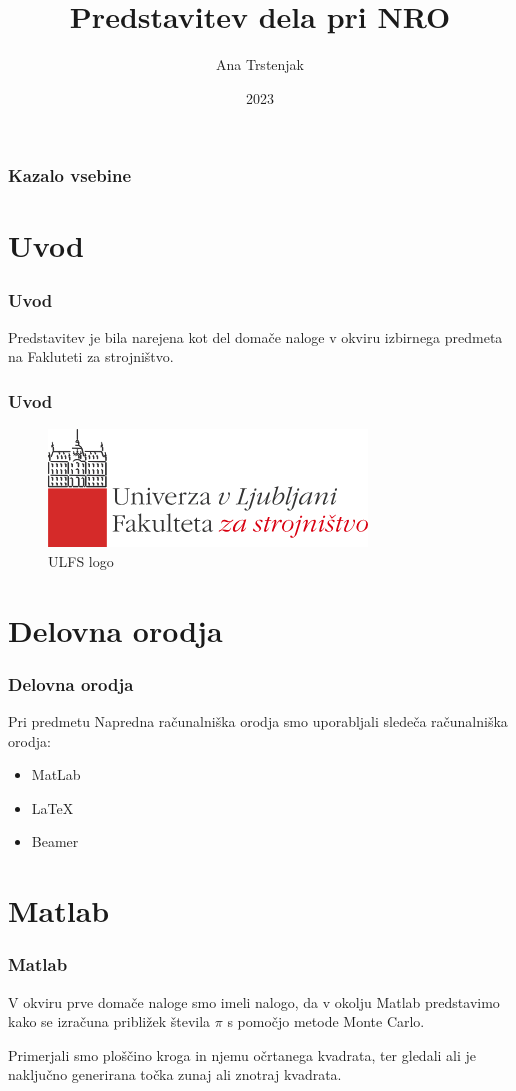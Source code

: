\documentclass{beamer}
\title{Predstavitev dela pri NRO}
\author{Ana Trstenjak}
\institute{Fakulteta za strojništvo, UL}
\date{2023}
\begin{document}
\frame{\titlepage}
\begin{frame}
\frametitle{Kazalo vsebine}
\tableofcontents
\end{frame}

\section{Uvod}
\begin{frame}
\frametitle{Uvod}
Predstavitev je bila narejena kot del domače naloge v okviru izbirnega predmeta na Fakluteti za strojništvo.

  \frametitle{Uvod}

\begin{figure}
  \includegraphics[width=0.3\linewidth]{ULFS logo.png}
    \caption{ULFS logo}
  \end{figure}
  \end{frame}


\section{Delovna orodja}
\begin{frame}
\frametitle{Delovna orodja}
Pri predmetu Napredna računalniška orodja smo uporabljali sledeča računalniška orodja:
\begin{itemize}
  \item MatLab
  \pause
  \item LaTeX
  \pause
  \item Beamer
\end{itemize}
\end{frame}

\section{Matlab}
\begin{frame}
\frametitle{Matlab}
V okviru prve domače naloge smo imeli nalogo, da v okolju Matlab predstavimo kako se izračuna približek števila $\pi$ s pomočjo metode Monte Carlo.

Primerjali smo ploščino kroga in njemu očrtanega kvadrata, ter gledali ali je naključno generirana točka zunaj ali znotraj kvadrata.
\end{frame}
\end{document}
